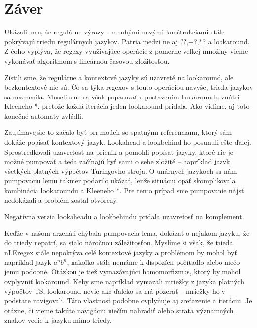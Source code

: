 \chapter*{Záver}\label{chap:conc}
{}

Ukázali sme, že regulárne výrazy s mnohými novými konštrukciami stále pokrývajú triedu regulárnych jazykov. Patria medzi ne aj {\ttfamily \selectfont ??,+?,$*$?} a lookaround. Z čoho vyplýva, že regexy využívajúce operácie z pomerne veľkej množiny vieme vykonávať algoritmom s lineárnou časovou zložitosťou.

Zistili sme, že regulárne a kontextové jazyky sú uzavreté na lookaround, ale bezkontextové nie sú. Čo sa týka regexov s touto operáciou navyše, trieda jazykov sa nezmenila. Museli sme sa však popasovať s postavením lookaroundu vnútri Kleeneho $*$, pretože každá iterácia jeden lookaround pridala. Ako vidíme, aj toto konečné automaty zvládli.

Zaujímavejšie to začalo byť pri modeli so spätnými referenciami, ktorý sám dokáže popísať kontextový jazyk. Lookahead a lookbehind ho posunuli ešte ďalej. Sprostredkovali uzavretosť na prienik a pomohli popísať jazyky, ktoré nie je možné pumpovať a teda začínajú byť sami o sebe zložité -- napríklad jazyk všetkých platných výpočtov Turingovho stroja. O unárnych jazykoch sa nám pumpovaciu lemu takmer podarilo ukázať, lenže situáciu opäť skomplikovala kombinácia lookaroundu a Kleeneho $*$. Pre tento prípad sme pumpovanie nájsť nedokázali a problém zostal otvorený.

Negatívna verzia lookaheadu a lookbehindu pridala uzavretosť na komplement.

Keďže v našom arzenáli chýbala pumpovacia lema, dokázať o nejakom jazyku, že do triedy nepatrí, sa stalo náročnou záležitosťou. Myslíme si však, že trieda nLEregex stále nepokrýva celé kontextové jazyky a problémom by mohol byť napríklad jazyk $a^nb^n$, nakoľko stále nemáme k dispozícii počítadlo alebo niečo jemu podobné. Otázkou je tiež vymazávajúci homomorfizmus, ktorý by mohol ovplyvniť lookaround. Keby sme napríklad vymazali mriežky z jazyka platných výpočtov TS, lookaround nevie ako ďaleko sa má pozerať -- mriežky ho v podstate navigovali. Táto vlastnosť podobne ovplyňuje aj zreťazenie a iteráciu. Je otázne, či vieme takúto navigáciu niečím nahradiť alebo strata významných znakov vedie k jazyku mimo triedy.

